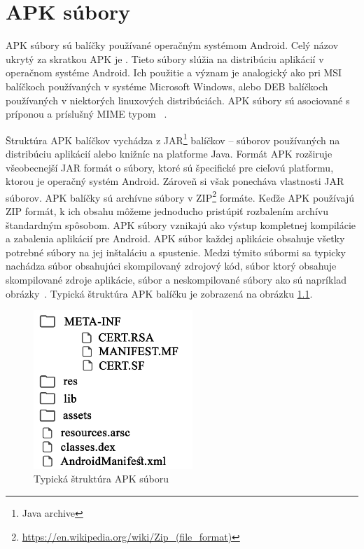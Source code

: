 \chapter{APK súbory}
\label{APKsubory}
APK súbory sú balíčky používané operačným systémom Android. Celý názov ukrytý za skratkou APK je . Tieto súbory slúžia na distribúciu aplikácií v operačnom systéme Android. Ich použitie a význam je analogický ako pri MSI balíčkoch používaných v systéme Microsoft Windows, alebo DEB balíčkoch používaných v niektorých linuxových distribúciách. APK súbory sú asociované s príponou  a príslušný MIME typom ~\cite{Freed2016}.

Štruktúra APK balíčkov vychádza z JAR\footnote{Java archive} balíčkov -- súborov používaných na distribúciu aplikácií alebo knižníc na platforme Java. Formát APK rozširuje všeobecnejší JAR formát o súbory, ktoré sú špecifické pre cieľovú platformu, ktorou je operačný systém Android. Zároveň si však ponecháva vlastnosti JAR súborov. APK balíčky sú archívne súbory v ZIP\footnote{\url{https://en.wikipedia.org/wiki/Zip\_(file_format)}} formáte.  Keďže APK používajú ZIP formát, k ich obsahu môžeme jednoducho pristúpiť rozbalením archívu štandardným spôsobom.  APK súbory vznikajú ako výstup kompletnej kompilácie a zabalenia aplikácií pre Android. APK súbor každej aplikácie obsahuje všetky potrebné súbory na jej inštaláciu a spustenie. Medzi týmito súbormi sa typicky nachádza súbor  obsahujúci skompilovaný zdrojový kód, súbor  ktorý obsahuje skompilované zdroje aplikácie, súbor  a neskompilované súbory ako sú napríklad obrázky~\cite{buildingAndRunning}. Typická štruktúra APK balíčku je zobrazená na obrázku \ref{fig:strukturaApk}.
\begin{figure}[htb]
  \begin{center}
    \includegraphics[width=60mm]{images/apkStructure.pdf}
  \end{center}
  \caption{Typická štruktúra APK súboru}
  \label{fig:strukturaApk}
\end{figure}
